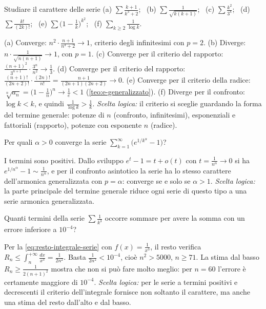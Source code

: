 \begin{esercizio}\label{es:carattere}
Studiare il carattere delle serie
(a) $\sum\frac{k+1}{k^{3}+2}$; \ (b) $\sum\frac1{\sqrt{k(k+1)}}$; \ (c) $\sum\frac{k^{2}}{3^{k}}$; \
(d) $\sum\frac{k!}{(2k)!}$; \ (e) $\sum\bigl(1-\frac1k\bigr)^{k^{2}}$; \ (f) $\sum_{k\ge2}\frac1{\log k}$.
\begin{soluzione}
(a) Converge: $n^{2}\cdot\frac{n+1}{n^{3}+2}\to1$, criterio degli infinitesimi con $p=2$.
(b) Diverge: $n\cdot\frac1{\sqrt{n(n+1)}}\to1$, con $p=1$.
(c) Converge per il criterio del rapporto: $\frac{(n+1)^{2}}{3^{n+1}}\cdot\frac{3^{n}}{n^{2}}\to\frac13$.
(d) Converge per il criterio del rapporto: $\frac{(n+1)!}{(2n+2)!}\cdot\frac{(2n)!}{n!}=\frac{n+1}{(2n+1)(2n+2)}\to0$.
(e) Converge per il criterio della radice: $\sqrt[n]{a_{n}}=\bigl(1-\frac1n\bigr)^{n}\to\frac1e<1$
(\cref{teo:e-generalizzato}).
(f) Diverge per il confronto: $\log k<k$, e quindi $\frac1{\log k}>\frac1k$.
\emph{Scelta logica:} il criterio si sceglie guardando la forma del termine generale:
potenze di $n$ (confronto, infinitesimi), esponenziali e fattoriali (rapporto), potenze
con esponente $n$ (radice).
\end{soluzione}
\end{esercizio}

\begin{esercizio}
Per quali $\alpha>0$ converge la serie $\sum_{k=1}^{\infty}\bigl(e^{1/k^{\alpha}}-1\bigr)$?
\begin{soluzione}
I termini sono positivi. Dallo sviluppo $e^{t}-1=t+o(t)$ con $t=\frac1{n^{\alpha}}\to0$ si ha
$e^{1/n^{\alpha}}-1\sim\frac1{n^{\alpha}}$, e per il confronto asintotico la serie ha lo stesso carattere
dell'armonica generalizzata con $p=\alpha$: converge se e solo se $\alpha>1$. \emph{Scelta logica:}
la parte principale del termine generale riduce ogni serie di questo tipo a una serie
armonica generalizzata.
\end{soluzione}
\end{esercizio}

\begin{esercizio}
Quanti termini della serie $\sum\frac1{k^{3}}$ occorre sommare per avere la somma con un
errore inferiore a $10^{-4}$?
\begin{soluzione}
Per la \eqref{eq:resto-integrale-serie} con $f(x)=\frac1{x^{3}}$, il resto verifica
$R_{n}\le\int_{n}^{+\infty}\frac{dx}{x^{3}}=\frac1{2n^{2}}$. Basta $\frac1{2n^{2}}<10^{-4}$, cioè $n^{2}>5000$, $n\ge71$. La
stima dal basso $R_{n}\ge\frac1{2(n+1)^{2}}$ mostra che non si può fare molto meglio: per $n=60$
l'errore è certamente maggiore di $10^{-4}$. \emph{Scelta logica:} per le serie a termini
positivi e decrescenti il criterio dell'integrale fornisce non soltanto il carattere, ma
anche una stima del resto dall'alto e dal basso.
\end{soluzione}
\end{esercizio}

